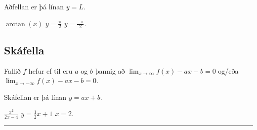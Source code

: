 \documentclass[a4paper,10pt,icelandic]{sphinxmanual}
\begin{document}
Aðfellan er þá línan \(y=L\).


 \(\arctan(x)\)  \(y=\frac{\pi}{2}\)  \(y=\frac{-\pi}{2}\).


\subsection{Skáfella}
\label{\detokenize{kafli05:skafella}}
Fallið \(f\) hefur  ef til eru \(a\) og \(b\)
þannig að \(\lim_{x\to \infty} f(x) -ax-b = 0\) og/eða
\(\lim_{x\to -\infty} f(x) -ax-b= 0\).

Skáfellan er þá línan \(y=ax+b\).


 \(\frac{x^2}{2x-4}\)  \(y=\frac{1}{2}x+1\)  \(x=2\).


\bigskip\hrule\bigskip


\newpage
\end{document}
